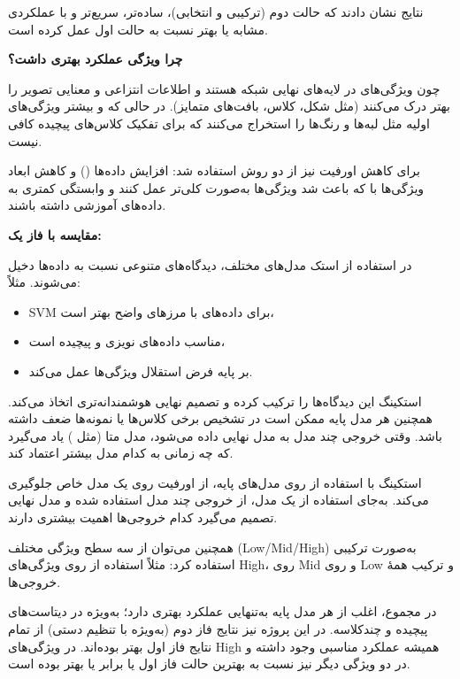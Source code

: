 \documentclass[a4paper,12pt]{article}
\begin{document}
نتایج نشان دادند که حالت دوم (ترکیبی و انتخابی)، ساده‌تر، سریع‌تر و با عملکردی مشابه یا بهتر نسبت به حالت اول عمل کرده است.

\textbf{چرا ویژگی  عملکرد بهتری داشت؟}

چون ویژگی‌های  در لایه‌های نهایی شبکه هستند و اطلاعات انتزاعی و معنایی تصویر را بهتر درک می‌کنند (مثل شکل، کلاس، بافت‌های متمایز). در حالی که  و  بیشتر ویژگی‌های اولیه مثل لبه‌ها و رنگ‌ها را استخراج می‌کنند که برای تفکیک کلاس‌های پیچیده کافی نیست.

برای کاهش اورفیت نیز از دو روش استفاده شد: افزایش داده‌ها () و کاهش ابعاد ویژگی‌ها با  که باعث شد ویژگی‌ها به‌صورت کلی‌تر عمل کنند و وابستگی کمتری به داده‌های آموزشی داشته باشند.

\textbf{مقایسه با فاز یک:}

در استفاده از استک مدل‌های مختلف، دیدگاه‌های متنوعی نسبت به داده‌ها دخیل می‌شوند. مثلاً:

\begin{itemize}
    \item SVM برای داده‌های با مرزهای واضح بهتر است،
    \item {} مناسب داده‌های نویزی و پیچیده است،
    \item {} بر پایه فرض استقلال ویژگی‌ها عمل می‌کند.
\end{itemize}

استکینگ این دیدگاه‌ها را ترکیب کرده و تصمیم نهایی هوشمندانه‌تری اتخاذ می‌کند. همچنین هر مدل پایه ممکن است در تشخیص برخی کلاس‌ها یا نمونه‌ها ضعف داشته باشد. وقتی خروجی چند مدل به مدل نهایی داده می‌شود، مدل متا (مثل ) یاد می‌گیرد که چه زمانی به کدام مدل بیشتر اعتماد کند.

استکینگ با استفاده از  روی مدل‌های پایه، از اورفیت روی یک مدل خاص جلوگیری می‌کند. به‌جای استفاده از یک مدل، از خروجی چند مدل استفاده شده و مدل نهایی تصمیم می‌گیرد کدام خروجی‌ها اهمیت بیشتری دارند.

همچنین می‌توان از سه سطح ویژگی مختلف (Low/Mid/High) به‌صورت ترکیبی استفاده کرد: مثلاً استفاده از  روی ویژگی‌های High،  روی Mid و  روی Low و ترکیب همهٔ خروجی‌ها.

در مجموع،  اغلب از هر مدل پایه به‌تنهایی عملکرد بهتری دارد؛ به‌ویژه در دیتاست‌های پیچیده و چندکلاسه. در این پروژه نیز نتایج فاز دوم (به‌ویژه با تنظیم دستی) از تمام نتایج فاز اول بهتر بوده‌اند. در ویژگی‌های High همیشه عملکرد مناسبی وجود داشته و در دو ویژگی دیگر نیز نسبت به بهترین حالت فاز اول یا برابر یا بهتر بوده است.
\end{document}
